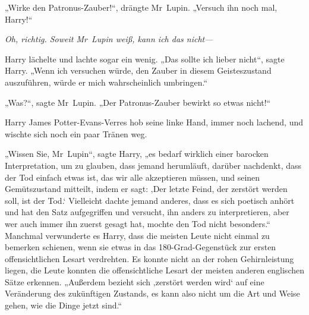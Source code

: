 „Wirke den Patronus-Zauber!“, drängte Mr~Lupin. „Versuch ihn noch mal, Harry!“

\emph{Oh, richtig. Soweit Mr~Lupin weiß, kann ich das nicht—}

Harry lächelte und lachte sogar ein wenig. „Das sollte ich lieber nicht“, sagte Harry. „Wenn ich versuchen würde, den Zauber in diesem Geisteszustand auszuführen, würde er mich wahrscheinlich umbringen.“

„Was?“, sagte Mr~Lupin. „Der Patronus-Zauber bewirkt so etwas nicht!“

Harry James Potter-Evans-Verres hob seine linke Hand, immer noch lachend, und wischte sich noch ein paar Tränen weg.

„Wissen Sie, Mr~Lupin“, sagte Harry, „es bedarf wirklich einer barocken Interpretation, um zu glauben, dass jemand herumläuft, darüber nachdenkt, dass der Tod einfach etwas ist, das wir alle akzeptieren müssen, und seinen Gemütszustand mitteilt, indem er sagt: ‚Der letzte Feind, der zerstört werden soll, ist der Tod.‘ Vielleicht dachte jemand anderes, dass es sich poetisch anhört und hat den Satz aufgegriffen und versucht, ihn anders zu interpretieren, aber wer auch immer ihn zuerst gesagt hat, mochte den Tod nicht besonders.“ Manchmal verwunderte es Harry, dass die meisten Leute nicht einmal zu bemerken schienen, wenn sie etwas in das 180-Grad-Gegenstück zur ersten offensichtlichen Lesart verdrehten. Es konnte nicht an der rohen Gehirnleistung liegen, die Leute konnten die offensichtliche Lesart der meisten anderen englischen Sätze erkennen. „Außerdem bezieht sich ‚zerstört werden wird‘ auf eine Veränderung des zukünftigen Zustands, es kann also nicht um die Art und Weise gehen, wie die Dinge jetzt sind.“

